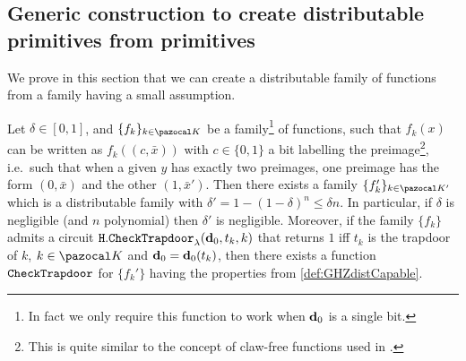 \subsection{Generic construction to create distributable \AssumpFctCanPrime{} primitives from \AssumpFct{} primitives}\label{sec:compilerAssumpFctCan}

We prove in this section that we can create a distributable \AssumpFctCanPrime{} family of functions from a \AssumpFct{} family having a small assumption.

\begin{theoremE}\label{thm:compiler}
  Let $\delta \in [0,1]$, and $\{f_k\}_{k \in \cK}$ be a \AssumpFct{} family\footnote{In fact we only require this function to work when $\mathbf{d}_0$ is a single bit.} of functions, such that $f_k(x)$ can be written as $f_k((c,\bar{x}))$ with $c \in \{0,1\}$ a bit labelling the preimage\footnote{This is quite similar to the concept of claw-free functions used in \cite{mahadev2017classical}.}, i.e.\ such that when a given $y$ has exactly two preimages, one preimage has the form $(0,\bar{x})$ and the other $(1,\bar{x}')$. Then there exists a family $\{f_k'\}_{k \in \cK'}$ which is a distributable \AssumpFctCanPrime{} family with $\delta'=1-(1-\delta)^n \leq \delta n$. In particular, if $\delta$ is negligible (and $n$ polynomial) then $\delta'$ is negligible. Moreover, if the family $\{f_k\}$ admits a circuit ${\tt H.CheckTrapdoor}_\lambda(\mathbf{d}_0, t_k, k)$ that returns $1$ iff $t_k$ is the trapdoor of $k$, $k \in \cK$ and $\mathbf{d}_0 = \mathbf{d}_0(t_k)$, then there exists a function ${\tt CheckTrapdoor}$ for $\{f_k'\}$ having the properties from \cref{def:GHZdistCapable}.


\end{theoremE}
